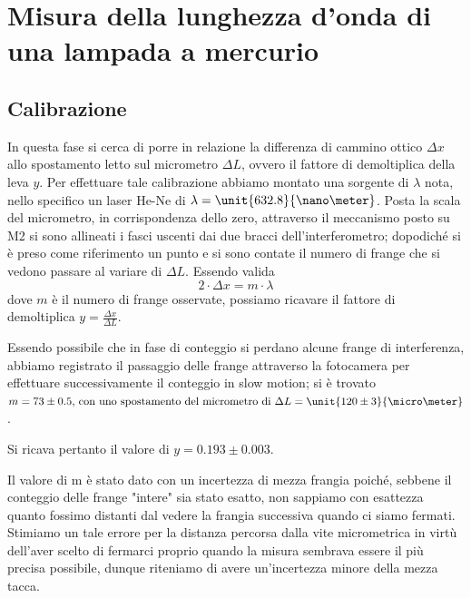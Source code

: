 \section{Misura della lunghezza d'onda di una lampada a mercurio}
\subsection{Calibrazione}
In questa fase si cerca di porre in relazione la differenza 
di cammino ottico $\Delta x$ allo spostamento letto 
sul micrometro $\Delta L$,
ovvero il fattore di demoltiplica della leva $y$.
Per effettuare tale calibrazione abbiamo 
montato una sorgente di  $\lambda$ nota, nello specifico un laser
He-Ne di $\lambda=\unit{632.8}{\nano\meter}$.
Posta la scala del micrometro, in corrispondenza dello zero,
attraverso il meccanismo posto su M2 si sono allineati i fasci 
uscenti dai due bracci dell'interferometro;
dopodiché si è preso 
come riferimento un punto e si sono contate il numero di frange che si vedono 
passare al variare di $\Delta L$.
Essendo valida \smallskip
\begin{equation*}\label{eq:lambda}
2 \cdot \Delta x = m \cdot \lambda
 \end{equation*}
 \smallskip
dove $m$ è il numero di frange osservate, possiamo ricavare 
il fattore di demoltiplica $y=\frac{\Delta x}{\Delta L}$.

Essendo possibile che in fase di conteggio si perdano 
alcune frange di interferenza, abbiamo registrato il passaggio delle frange attraverso la fotocamera 
per effettuare successivamente il conteggio in slow motion; si è trovato
$m=73 \pm 0.5 \text{, con uno spostamento del micrometro di } \Delta L =\unit{120\pm 3}{\micro\meter}$.

Si ricava pertanto il valore di $y= 0.193	\pm	0.003$.

Il valore di m è stato dato con un incertezza di mezza frangia poiché, sebbene il conteggio delle frange "intere" sia stato esatto, non sappiamo con esattezza quanto fossimo distanti dal vedere la frangia successiva quando ci siamo fermati.
Stimiamo un tale errore per la distanza percorsa dalla vite micrometrica 
in virtù dell'aver scelto di fermarci proprio quando la misura sembrava essere il più precisa possibile,
dunque riteniamo di avere un'incertezza minore della mezza tacca.
